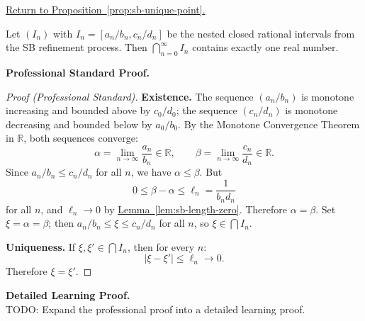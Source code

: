 
\newpage
{}
\label{prf:sb-unique-point}

\begin{remark*}[Return]
\hyperref[prop:sb-unique-point]{Return to Proposition~\ref*{prop:sb-unique-point}.}
\end{remark*}

\begin{theorem*}
Let $(I_n)$ with $I_n = [a_n/b_n, c_n/d_n]$ be the nested closed rational
intervals from the SB refinement process.  Then $\bigcap_{n=0}^{\infty} I_n$
contains exactly one real number.
\end{theorem*}

\textbf{Professional Standard Proof.}~\\
\begin{proof}
[Proof (Professional Standard)]
\textbf{Existence.} The sequence $(a_n/b_n)$ is monotone increasing and
bounded above by $c_0/d_0$; the sequence $(c_n/d_n)$ is monotone decreasing
and bounded below by $a_0/b_0$.  By the Monotone Convergence Theorem in
$\mathbb{R}$, both sequences converge:
\[
\alpha = \lim_{n\to\infty} \frac{a_n}{b_n} \in \mathbb{R},
\qquad
\beta = \lim_{n\to\infty} \frac{c_n}{d_n} \in \mathbb{R}.
\]
Since $a_n/b_n \leq c_n/d_n$ for all $n$, we have $\alpha \leq \beta$.
But
\[
0 \leq \beta - \alpha \leq \ell_n = \frac{1}{b_n d_n}
\]
for all $n$, and $\ell_n \to 0$
by \hyperref[lem:sb-length-zero]{Lemma~\ref*{lem:sb-length-zero}}.
Therefore $\alpha = \beta$.  Set $\xi = \alpha = \beta$; then
$a_n/b_n \leq \xi \leq c_n/d_n$ for all $n$, so $\xi \in \bigcap I_n$.

\textbf{Uniqueness.} If $\xi, \xi' \in \bigcap I_n$, then for every $n$:
\[
|\xi - \xi'| \leq \ell_n \to 0.
\]
Therefore $\xi = \xi'$.
\end{proof}

\textbf{Detailed Learning Proof.}~\\
TODO: Expand the professional proof into a detailed learning proof.


